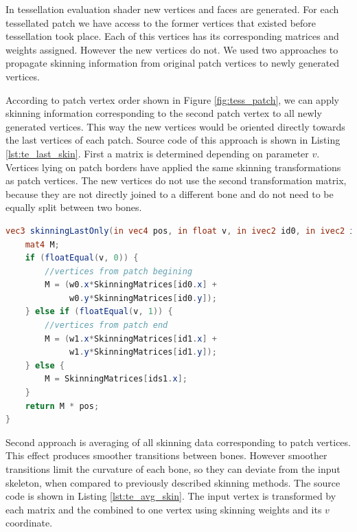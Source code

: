 In tessellation evaluation shader new vertices and faces are generated.
For each tessellated patch we have access to the former vertices that existed before tessellation took place.
Each of this vertices has its corresponding matrices and weights assigned.
However the new vertices do not.
We used two approaches to propagate skinning information from original patch vertices to newly generated vertices.

According to patch vertex order shown in Figure \ref{fig:tess_patch}, we can apply skinning information corresponding to the second patch vertex to all newly generated vertices.
This way the new vertices would be oriented directly towards the last vertices of each patch.
Source code of this approach is shown in Listing \ref{lst:te_last_skin}.
First a matrix is determined depending on parameter $v$.
Vertices lying on patch borders have applied the same skinning transformations as patch vertices.
The new vertices do not use the second transformation matrix, because they are not directly joined to a different bone and do not need to be equally split between two bones.

\linespread{1.2}
\begin{lstlisting}[language=GLSL,caption={Linear Blend Skinning implemented in tessellation evaluation shader, using only skinning information from the first patch vertex.},label={lst:te_last_skin}]
vec3 skinningLastOnly(in vec4 pos, in float v, in ivec2 id0, in ivec2 id1, in vec2 w0, in vec2 w1, in mat4 SkinningMatrices[SKINNING_MATRICES]) {
	mat4 M;
	if (floatEqual(v, 0)) {
		//vertices from patch begining
		M = (w0.x*SkinningMatrices[id0.x] +
			 w0.y*SkinningMatrices[id0.y]);
	} else if (floatEqual(v, 1)) {
		//vertices from patch end
		M = (w1.x*SkinningMatrices[id1.x] +
			 w1.y*SkinningMatrices[id1.y]);
	} else {
		M = SkinningMatrices[ids1.x];
	}
	return M * pos;
}
\end{lstlisting} 
\linespread{1.5}

Second approach is averaging of all skinning data corresponding to patch vertices.
This effect produces smoother transitions between bones.
However smoother transitions limit the curvature of each bone, so they can deviate from the input skeleton, when compared to previously described skinning methods.
The source code is shown in Listing \ref{lst:te_avg_skin}.
The input vertex is transformed by each matrix and the combined to one vertex using skinning weights and its $v$ coordinate.

